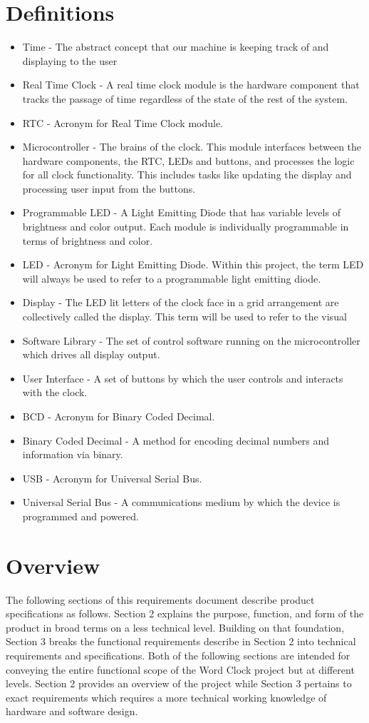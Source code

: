 \documentclass[10pt,draftclsnofoot,onecolumn]{IEEEtran}
\begin{document}
\section{Definitions}
\begin{itemize}
  \item Time - The abstract concept that our machine is keeping track of and displaying to the user
  \item Real Time Clock - A real time clock module is the hardware component that tracks the passage
  of time regardless of the state of the rest of the system.
  \item RTC - Acronym for Real Time Clock module.
  \item Microcontroller - The brains of the clock. This module interfaces between the hardware 
  components, the RTC, LEDs and buttons, and processes the logic for all clock functionality. 
  This includes tasks like updating the display and processing user input from the buttons.
  \item Programmable LED - A Light Emitting Diode that has variable levels of brightness and 
  color output. Each module is individually programmable in terms of brightness and color.
  \item LED - Acronym for Light Emitting Diode. Within this project, the term LED will always 
  be used to refer to a programmable light emitting diode.   
  \item Display - The LED lit letters of the clock face in a grid arrangement are collectively 
  called the display. This term will be used to refer to the visual 
  \item Software Library - The set of control software running on the microcontroller which drives all display output. 
  \item User Interface - A set of buttons by which the user controls and interacts with the clock.
  \item BCD - Acronym for Binary Coded Decimal.
  \item Binary Coded Decimal - A method for encoding decimal numbers and information via binary. 
  \item USB - Acronym for Universal Serial Bus.
  \item Universal Serial Bus - A communications medium by which the device is programmed and  powered.
\end{itemize}

\section{Overview}
The following sections of this requirements document describe product specifications as follows. 
Section 2 explains the purpose, function, and form of the product in broad terms on a less 
technical level. Building on that foundation, Section 3 breaks the functional requirements 
describe in Section 2 into technical requirements and specifications.
	Both of the following sections are intended for conveying the entire functional 
scope of the Word Clock project but at different levels. Section 2 provides an overview of the 
project while Section 3 pertains to exact requirements which requires a more technical working 
knowledge of hardware and software design.
\end{document}

